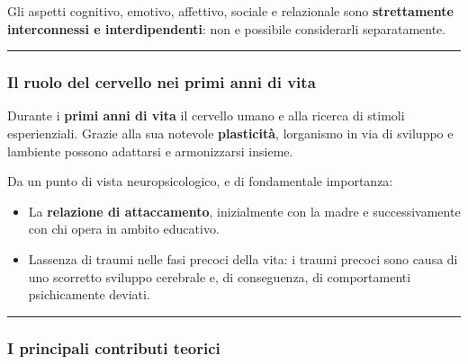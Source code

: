 \documentclass[a4paper,11pt]{article}
\providecommand{\tightlist}{%
  \setlength{\itemsep}{0pt}\setlength{\parskip}{0pt}}
\begin{document}
Gli aspetti cognitivo, emotivo, affettivo, sociale e relazionale sono
\textbf{strettamente interconnessi e interdipendenti}: non e possibile
considerarli separatamente.

\begin{center}\rule{0.5\linewidth}{0.5pt}\end{center}

\subsubsection{Il ruolo del cervello nei primi anni di
      vita}\label{il-ruolo-del-cervello-nei-primi-anni-di-vita}

Durante i \textbf{primi anni di vita} il cervello umano e alla ricerca
di stimoli esperienziali. Grazie alla sua notevole \textbf{plasticità},
l\textquotesingle organismo in via di sviluppo e
l\textquotesingle ambiente possono adattarsi e armonizzarsi insieme.

Da un punto di vista neuropsicologico, e di fondamentale importanza:

\begin{itemize}
      \tightlist
      \item
            La \textbf{relazione di attaccamento}, inizialmente con la madre e
            successivamente con chi opera in ambito educativo.
      \item
            L\textquotesingle assenza di traumi nelle fasi precoci della vita: i
            traumi precoci sono causa di uno scorretto sviluppo cerebrale e, di
            conseguenza, di comportamenti psichicamente deviati.
\end{itemize}

\begin{center}\rule{0.5\linewidth}{0.5pt}\end{center}

\subsubsection{I principali contributi
      teorici}\label{i-principali-contributi-teorici-1}
\end{document}
